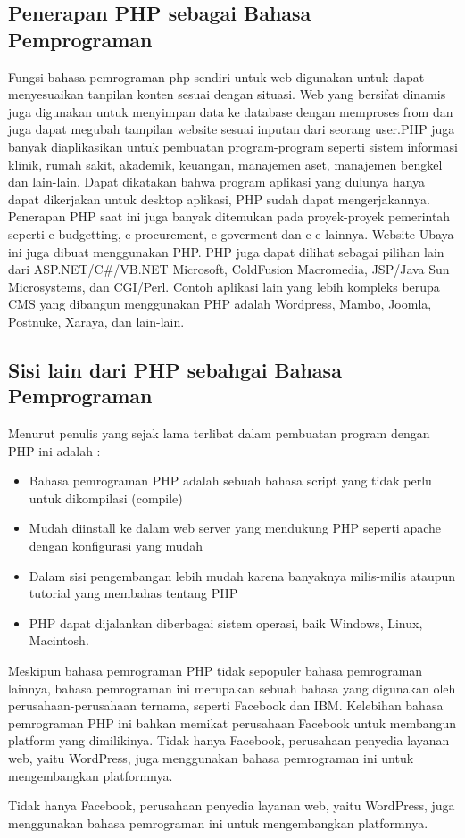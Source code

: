 \subsection{Penerapan PHP sebagai Bahasa Pemprograman}
Fungsi bahasa pemrograman php sendiri untuk web digunakan untuk dapat menyesuaikan tanpilan konten sesuai dengan situasi. Web yang bersifat dinamis juga digunakan untuk menyimpan data ke database dengan memproses from dan juga dapat megubah tampilan website sesuai inputan dari seorang user.PHP juga banyak diaplikasikan untuk pembuatan program-program seperti sistem informasi  klinik, rumah sakit, akademik, keuangan, manajemen aset, manajemen bengkel dan lain-lain. Dapat dikatakan bahwa program aplikasi yang dulunya hanya dapat dikerjakan untuk desktop aplikasi, PHP sudah dapat mengerjakannya.
Penerapan PHP saat ini juga banyak ditemukan pada proyek-proyek pemerintah seperti e-budgetting, e-procurement, e-goverment dan e e lainnya. Website Ubaya ini juga dibuat menggunakan PHP.
PHP juga dapat dilihat sebagai pilihan lain dari ASP.NET/C\#/VB.NET Microsoft, ColdFusion Macromedia, JSP/Java Sun Microsystems, dan CGI/Perl. Contoh aplikasi lain yang lebih kompleks berupa CMS yang dibangun menggunakan PHP adalah Wordpress, Mambo, Joomla, Postnuke, Xaraya, dan lain-lain.

\subsection{Sisi lain dari PHP  sebahgai Bahasa Pemprograman}
Menurut penulis yang sejak lama terlibat dalam pembuatan program dengan PHP ini adalah :
  \begin{itemize}
    \item Bahasa pemrograman PHP adalah sebuah bahasa script yang tidak perlu untuk dikompilasi (compile)
    \item Mudah diinstall ke dalam web server yang mendukung PHP seperti apache dengan konfigurasi yang mudah
    \item Dalam sisi pengembangan lebih mudah karena banyaknya milis-milis ataupun tutorial yang membahas tentang PHP
    \item PHP dapat dijalankan diberbagai sistem operasi, baik Windows, Linux, Macintosh.
  \end{itemize}
Meskipun bahasa pemrograman PHP tidak sepopuler bahasa pemrograman lainnya, bahasa pemrograman ini merupakan sebuah bahasa yang digunakan oleh perusahaan-perusahaan ternama, seperti Facebook dan IBM.
Kelebihan bahasa pemrograman PHP ini bahkan memikat perusahaan Facebook untuk membangun platform yang dimilikinya. Tidak hanya Facebook, perusahaan penyedia layanan web, yaitu WordPress, juga menggunakan bahasa pemrograman ini untuk mengembangkan platformnya.

Tidak hanya Facebook, perusahaan penyedia layanan web, yaitu WordPress, juga menggunakan bahasa pemrograman ini untuk mengembangkan platformnya.




